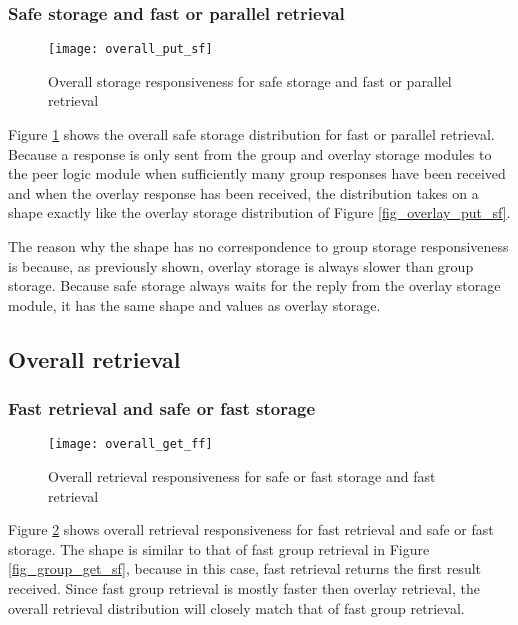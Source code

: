 \subsubsection{Safe storage and fast or parallel retrieval}
\begin{figure}[htbp]
 \centering
 \texttt{[image: overall\_put\_sf]}
 \caption{Overall storage responsiveness for safe storage and fast or parallel retrieval}
 \label{fig_overall_put_sf}
\end{figure}
%
Figure \ref{fig_overall_put_sf} shows the overall safe storage distribution for fast or parallel retrieval. Because a response is only sent from the group and overlay storage modules to the peer logic module when sufficiently many group responses have been received and when the overlay response has been received, the distribution takes on a shape exactly like the overlay storage distribution of Figure \ref{fig_overlay_put_sf}.

The reason why the shape has no correspondence to group storage responsiveness is because, as previously shown, overlay storage is always slower than group storage. Because safe storage always waits for the reply from the overlay storage module, it has the same shape and values as overlay storage.

\subsection{Overall retrieval}
\subsubsection{Fast retrieval and safe or fast storage}
\begin{figure}[htbp]
 \centering
 \texttt{[image: overall\_get\_ff]}
 \caption{Overall retrieval responsiveness for safe or fast storage and fast retrieval}
 \label{fig_overall_get_ff}
\end{figure}
%
Figure \ref{fig_overall_get_ff} shows overall retrieval responsiveness for fast retrieval and safe or fast storage. The shape is similar to that of fast group retrieval in Figure \ref{fig_group_get_sf}, because in this case, fast retrieval returns the first result received. Since fast group retrieval is mostly faster then overlay retrieval, the overall retrieval distribution will closely match that of fast group retrieval.

